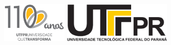\documentclass[%
  final,%
  english,%
  english,%
]{beamer}
\begin{document}
\begin{frame}[t, fragile = singleslide]

\begin{columns}[b]
%
\begin{column}{0.49\textwidth}
\end{column}
%
\begin{column}{0.49\textwidth}
\begin{flushright}
\includegraphics[height = 20mm]{./Logos/utfpr-110anos}%
\hspace*{5mm}
\includegraphics[height = 20mm]{./Logos/utfpr}%
\end{flushright}
\end{column}
%
\end{columns}

\vspace*{\baselineskip}

\end{frame}

\end{document}
